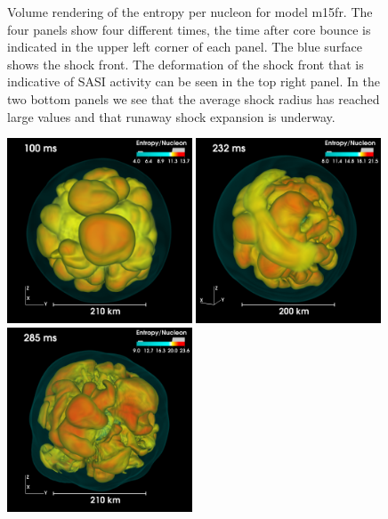 \begin{figure}[ht]
\caption{Volume rendering of the entropy per nucleon for model m15fr. The four panels show four different times,
the time after core bounce is indicated in the upper left corner of each panel. 
The blue surface shows the shock front.
The deformation of the shock front that is indicative of SASI activity can be seen in the top right panel. 
In the two bottom panels we see that the
average shock radius has reached large values and that runaway shock expansion is underway.\label{figp2:3dpics}}
\end{figure}

\begin{figure}[ht]         
\centering                            
\includegraphics[width=0.49\textwidth]{./images/paper2/m15r1.png}
\includegraphics[width=0.49\textwidth]{./images/paper2/m15r2.png} \\
\includegraphics[width=0.49\textwidth]{./images/paper2/m15r3.png}

\end{figure}
